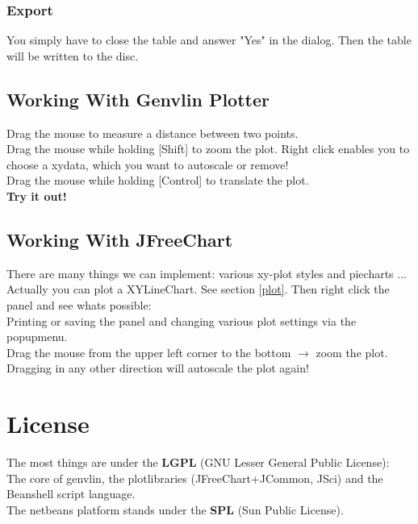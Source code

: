 \documentclass[12pt]{article}
\begin{document}
\subsubsection{Export}
You simply have to close the table and answer "Yes" in the dialog. Then the table will be written to the disc.
\subsection{Working With Genvlin Plotter}
Drag the mouse to measure a distance between two points.\\
Drag the mouse while holding [Shift] to zoom the plot. Right click enables you to choose a xydata, which you want to autoscale or remove!\\
Drag the mouse while holding [Control] to translate the plot.\\
{\bf Try it out!}
\subsection{Working With JFreeChart}
There are many things we can implement: various xy-plot styles and piecharts ...\\
Actually you can plot a XYLineChart. See section \ref{plot}. Then right click the panel and see whats possible:\\
Printing or saving the panel and changing various plot settings via the popupmenu.\\
Drag the mouse from the upper left corner to the bottom $\rightarrow$ zoom the plot. Dragging in any other direction will autoscale the plot again!\\
\section{License}
The most things are under the {\bf LGPL} (GNU Lesser General Public License):\\
The core of genvlin, the plotlibraries (JFreeChart+JCommon, JSci) and the Beanshell script language.\\
The netbeans platform stands under the {\bf SPL} (Sun Public License).\\
\end{document}
